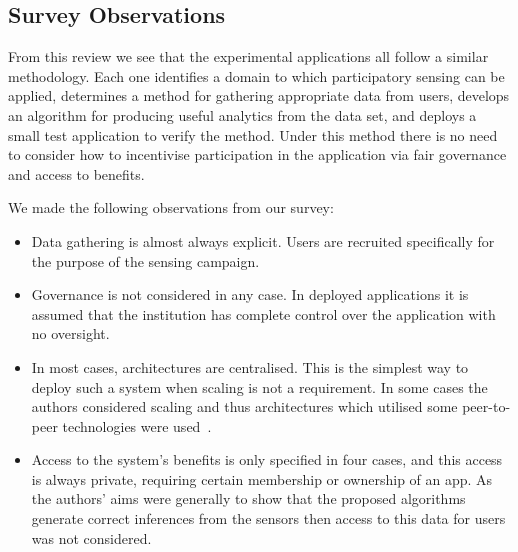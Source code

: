 \subsection{Survey Observations}

From this review we see that the experimental applications all follow a similar methodology. 
Each one identifies a domain to which participatory sensing can be applied, determines a method for gathering appropriate data from users, develops an algorithm for producing useful analytics from the data set, and deploys a small test application to verify the method. Under this method there is no need to consider how to incentivise participation in the application via fair governance and access to benefits. 

We made the following observations from our survey:
\begin{itemize}
\item Data gathering is almost always explicit. Users are recruited specifically for the purpose of the sensing campaign.
\item Governance is not considered in any case. In deployed applications it is assumed that the institution has complete control over the application with no oversight.
\item In most cases, architectures are centralised. This is the simplest way to deploy such a system when scaling is not a requirement. In some cases the authors considered scaling and thus architectures which utilised some peer-to-peer technologies were used~\citep{Mendez2011,Hasenfratz2012}.
\item Access to the system's benefits is only specified in four cases, and this access is always private, requiring certain membership or ownership of an app. As the authors' aims were generally to show that the proposed algorithms generate correct inferences from the sensors then access to this data for users was not considered.
\end{itemize}

